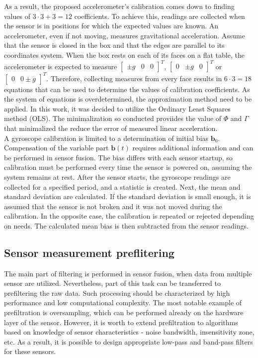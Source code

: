 As a result, the proposed accelerometer’s calibration comes down to finding values of $3 \cdot 3 + 3 = 12$ coefficients. To achieve this, readings are collected when the sensor is in positions for which the expected values are known. An accelerometer, even if not moving, measures gravitational acceleration. Assume that the sensor is closed in the box and that the edges are parallel to its coordinates system. When the box rests on each of its faces on a flat table, the accelerometer is expected to measure $\begin{bmatrix}\pm g & 0 & 0\end{bmatrix}^T$, $\begin{bmatrix}0 & \pm g & 0\end{bmatrix}^T$ or $\begin{bmatrix} 0 & 0 \pm g\end{bmatrix}^T$. Therefore, collecting measures from every face results in $6 \cdot 3 = 18$ equations that can be used to determine the values of calibration coefficients. As the system of equations is overdetermined, the approximation method need to be applied. In this work, it was decided to utilize the Ordinary Least Squares method (OLS). The minimalization so conducted proviides the value of $\bm{\varPhi}$ and $\bm{\varGamma}$ that minimalized the reduce the error of measured linear acceleration.\\

A gyroscope calibration is limited to a determination of initial bias $\bm{b}_0$. Compensation of the variable part $\bm{b}(t)$ requires additional information and can be performed in sensor fusion. The bias differs with each sensor startup, so calibration must be performed every time the sensor is powered on, assuming the system remains at rest. After the sensor starts, the gyroscope readings are collected for a specified period, and a statistic is created. Next, the mean and standard deviation are calculated. If the standard deviation is small enough, it is assumed that the sensor is not broken and it was not moved during the calibration. In the opposite case, the calibration is repeated or rejected depending on needs. The calculated mean bias is then subtracted from the sensor readings.\\

\subsection{Sensor measurement preflitering}

The main part of filtering is performed in sensor fusion, when data from multiple sensor are utilized. Nevertheless, part of this task can be transferred to prefiltering the raw data. Such processing should be characterized by high performance and low computational complexity. The most notable example of prefiltration is oversampling, which can be performed already on the hardware layer of the sensor. However, it is worth to extend prefiltration to algorithms based on knowledge of sensor characteristics - noise bandwidth, insensitivity zone, etc. As a result, it is possible to design appropriate low-pass and band-pass filters for these sensors. \\

